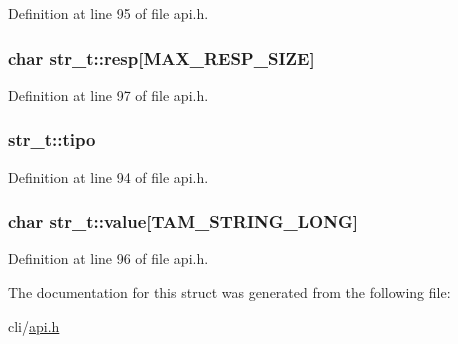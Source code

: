 Definition at line 95 of file api.h.

\hypertarget{structstr__t_ad42e93fea3f08fbb36e52f2601766c19}{
\subsubsection[{resp}]{\setlength{\rightskip}{0pt plus 5cm}char {\bf str\_\-t::resp}\mbox{[}MAX\_\-RESP\_\-SIZE\mbox{]}}}
\label{structstr__t_ad42e93fea3f08fbb36e52f2601766c19}


Definition at line 97 of file api.h.

\hypertarget{structstr__t_ab27624a13ae4ed3540ca512b85ff6335}{
\subsubsection[{tipo}]{ {\bf str\_\-t::tipo}}}
\label{structstr__t_ab27624a13ae4ed3540ca512b85ff6335}


Definition at line 94 of file api.h.

\hypertarget{structstr__t_aa2a1a455cb1921c134c223939a18812d}{
\subsubsection[{value}]{\setlength{\rightskip}{0pt plus 5cm}char {\bf str\_\-t::value}\mbox{[}TAM\_\-STRING\_\-LONG\mbox{]}}}
\label{structstr__t_aa2a1a455cb1921c134c223939a18812d}


Definition at line 96 of file api.h.



The documentation for this struct was generated from the following file:\begin{DoxyCompactItemize}
\item 
cli/\hyperlink{api_8h}{api.h}\end{DoxyCompactItemize}
